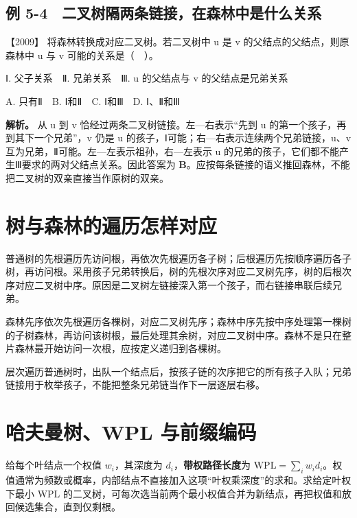 
\subsection{例 5-4　二叉树隔两条链接，在森林中是什么关系}\label{ds-ex5-4}

\noindent{}【2009】 将森林转换成对应二叉树。若二叉树中 u 是 v 的父结点的父结点，则原森林中 u 与 v 可能的关系是（　）。

Ⅰ. 父子关系　Ⅱ. 兄弟关系　Ⅲ. u 的父结点与 v 的父结点是兄弟关系

A. 只有Ⅱ　B. Ⅰ和Ⅱ　C. Ⅰ和Ⅲ　D. Ⅰ、Ⅱ和Ⅲ


\textbf{解析。} 从 u 到 v 恰经过两条二叉树链接。左---右表示``先到 u 的第一个孩子，再到其下一个兄弟''，v 仍是 u 的孩子，Ⅰ可能；右---右表示连续两个兄弟链接，u、v 互为兄弟，Ⅱ可能。左---左表示祖孙，右---左表示 u 的兄弟的孩子，它们都不能产生Ⅲ要求的两对父结点关系。因此答案为 \textbf{B}。应按每条链接的语义推回森林，不能把二叉树的双亲直接当作原树的双亲。

\section{树与森林的遍历怎样对应}\label{ds-05-08}

普通树的先根遍历先访问根，再依次先根遍历各子树；后根遍历先按顺序遍历各子树，再访问根。采用孩子兄弟转换后，树的先根次序对应二叉树先序，树的后根次序对应二叉树中序。原因是二叉树左链接深入第一个孩子，而右链接串联后续兄弟。

森林先序依次先根遍历各棵树，对应二叉树先序；森林中序先按中序处理第一棵树的子树森林，再访问该树根，最后处理其余树，对应二叉树中序。森林不是只在整片森林最开始访问一次根，应按定义递归到各棵树。

层次遍历普通树时，出队一个结点后，按孩子链的次序把它的所有孩子入队；兄弟链接用于枚举孩子，不能把整条兄弟链当作下一层逐层右移。

\section{哈夫曼树、WPL 与前缀编码}\label{ds-05-09}

给每个叶结点一个权值 \(w_i\)，其深度为 \(d_i\)，\textbf{带权路径长度}为 \(\mathrm{WPL}=\sum_iw_id_i\)。权值通常为频数或概率，内部结点不直接加入这项``叶权乘深度''的求和。求给定叶权下最小 WPL 的二叉树，可每次选当前两个最小权值合并为新结点，再把权值和放回候选集合，直到仅剩根。

